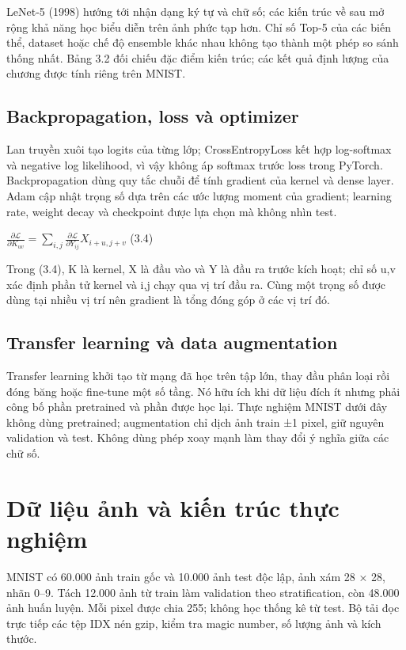 LeNet-5 (1998) hướng tới nhận dạng ký tự và chữ số; các kiến trúc về sau
mở rộng khả năng học biểu diễn trên ảnh phức tạp hơn. Chỉ số Top-5 của
các biến thể, dataset hoặc chế độ ensemble khác nhau không tạo thành một
phép so sánh thống nhất. Bảng 3.2 đối chiếu đặc điểm kiến trúc; các kết
quả định lượng của chương được tính riêng trên MNIST.

\subsection{Backpropagation, loss và optimizer}\label{backpropagation-loss-vuxe0-optimizer}

Lan truyền xuôi tạo logits của từng lớp; CrossEntropyLoss kết hợp
log-softmax và negative log likelihood, vì vậy không áp softmax trước
loss trong PyTorch. Backpropagation dùng quy tắc chuỗi để tính gradient
của kernel và dense layer. Adam cập nhật trọng số dựa trên các ước lượng
moment của gradient; learning rate, weight decay và checkpoint được lựa
chọn mà không nhìn test.

\(\frac{\partial\mathcal{L}}{\partial K_{uv}} = \sum_{i,j}^{}\frac{\partial\mathcal{L}}{\partial Y_{ij}}X_{i + u,j + v}\)
(3.4)

Trong (3.4), K là kernel, X là đầu vào và Y là đầu ra trước kích hoạt;
chỉ số u,v xác định phần tử kernel và i,j chạy qua vị trí đầu ra. Cùng
một trọng số được dùng tại nhiều vị trí nên gradient là tổng đóng góp ở
các vị trí đó.

\subsection{Transfer learning và data augmentation}\label{transfer-learning-vuxe0-data-augmentation}

Transfer learning khởi tạo từ mạng đã học trên tập lớn, thay đầu phân
loại rồi đóng băng hoặc fine-tune một số tầng. Nó hữu ích khi dữ liệu
đích ít nhưng phải công bố phần pretrained và phần được học lại. Thực
nghiệm MNIST dưới đây không dùng pretrained; augmentation chỉ dịch ảnh
train ±1 pixel, giữ nguyên validation và test. Không dùng phép xoay mạnh
làm thay đổi ý nghĩa giữa các chữ số.

\section{Dữ liệu ảnh và kiến trúc thực nghiệm}\label{dux1eef-liux1ec7u-ux1ea3nh-vuxe0-kiux1ebfn-truxfac-thux1ef1c-nghiux1ec7m}

MNIST có 60.000 ảnh train gốc và 10.000 ảnh test độc lập, ảnh xám 28 ×
28, nhãn 0--9. Tách 12.000 ảnh từ train làm validation theo
stratification, còn 48.000 ảnh huấn luyện. Mỗi pixel được chia 255;
không học thống kê từ test. Bộ tải đọc trực tiếp các tệp IDX nén gzip,
kiểm tra magic number, số lượng ảnh và kích thước.

